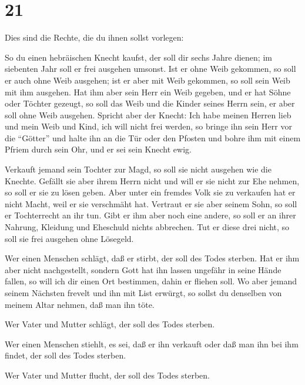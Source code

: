 \hypertarget{section-20}{%
\section{21}\label{section-20}}

 Dies sind die Rechte, die du ihnen sollst vorlegen:

 So du einen hebräischen Knecht kaufst, der soll dir sechs
Jahre dienen; im siebenten Jahr soll er frei ausgehen umsonst.
 Ist er ohne Weib gekommen, so soll er auch ohne Weib
ausgehen; ist er aber mit Weib gekommen, so soll sein Weib mit ihm
ausgehen.  Hat ihm aber sein Herr ein Weib gegeben, und er
hat Söhne oder Töchter gezeugt, so soll das Weib und die Kinder seines
Herrn sein, er aber soll ohne Weib ausgehen.  Spricht aber
der Knecht: Ich habe meinen Herren lieb und mein Weib und Kind, ich will
nicht frei werden,  so bringe ihn sein Herr vor die
``Götter'' und halte ihn an die Tür oder den Pfosten und bohre ihm mit
einem Pfriem durch sein Ohr, und er sei sein Knecht ewig.

 Verkauft jemand sein Tochter zur Magd, so soll sie nicht
ausgehen wie die Knechte.  Gefällt sie aber ihrem Herrn
nicht und will er sie nicht zur Ehe nehmen, so soll er sie zu lösen
geben. Aber unter ein fremdes Volk sie zu verkaufen hat er nicht Macht,
weil er sie verschmäht hat.  Vertraut er sie aber seinem
Sohn, so soll er Tochterrecht an ihr tun.  Gibt er ihm aber
noch eine andere, so soll er an ihrer Nahrung, Kleidung und Eheschuld
nichts abbrechen.  Tut er diese drei nicht, so soll sie
frei ausgehen ohne Lösegeld.

 Wer einen Menschen schlägt, daß er stirbt, der soll des
Todes sterben.  Hat er ihm aber nicht nachgestellt, sondern
Gott hat ihn lassen ungefähr in seine Hände fallen, so will ich dir
einen Ort bestimmen, dahin er fliehen soll.  Wo aber jemand
seinem Nächsten frevelt und ihn mit List erwürgt, so sollst du denselben
von meinem Altar nehmen, daß man ihn töte.

 Wer Vater und Mutter schlägt, der soll des Todes sterben.

 Wer einen Menschen stiehlt, es sei, daß er ihn verkauft
oder daß man ihn bei ihm findet, der soll des Todes sterben.

 Wer Vater und Mutter flucht, der soll des Todes sterben.

